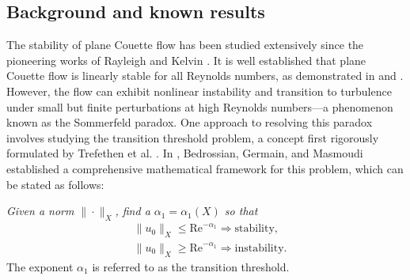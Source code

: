 \documentclass[11pt,reqno]{article}
\numberwithin{equation}{section}
\let\al=\alpha
\newcommand{\Rey}{\mathrm{Re}}
\begin{document}
	
	
	\subsection{Background and known results}
	
	The stability of plane Couette flow has been studied extensively since the pioneering works of Rayleigh \cite{Rayleigh} and Kelvin \cite{Kelvin}. It is well established that plane Couette flow is linearly stable for all Reynolds numbers, as demonstrated in \cite{Drazin-Reid} and \cite{Romanov}.  However, the flow can exhibit nonlinear instability and transition to turbulence under small but finite perturbations at high Reynolds numbers—a phenomenon known as the Sommerfeld paradox. One approach to resolving this paradox involves studying the transition threshold problem, a concept first rigorously formulated by Trefethen et al. \cite{Trefethen}.  In \cite{Bedrossian-Germain-Masmoudi-2017, Bedrossian-Germain-Masmoudi-2019}, Bedrossian, Germain, and Masmoudi established a comprehensive mathematical framework for this problem, which can be stated as follows:
	
	{\it Given a norm $\|\cdot\|_{X}$, find a $\alpha_1=\alpha_1(X)$ so that
		\begin{align*}
			&\|u_0\|_{X} \leq \Rey^{-\al_1} \Rightarrow \mathrm{stability},\\
			&\|u_0\|_{X} \geq \Rey^{-\alpha_1}\Rightarrow \mathrm{instability}.
		\end{align*}
	}
	The exponent $\alpha_1$ is referred to as the transition threshold. 
	
\end{document}
